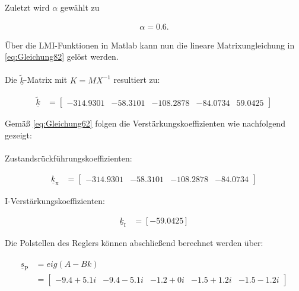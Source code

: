 Zuletzt wird $\alpha$ gewählt zu

\begin{align*}
    \alpha = 0.6.
\end{align*}

Über die LMI-Funktionen in Matlab kann nun die lineare Matrixungleichung in \autoref{eq:Gleichung82} gelöst werden.\\\\
Die $\underline{\tilde{k}}$-Matrix mit $K = MX^{-1}$ resultiert zu:

\begin{align}
    \underline{\tilde{k}} &= 
    \begin{bmatrix}
        -314.9301 & -58.3101 & -108.2878 & -84.0734 & 59.0425
    \end{bmatrix}
\end{align}

Gemäß \autoref{eq:Gleichung62} folgen die Verstärkungskoeffizienten wie nachfolgend gezeigt:\\\\
Zustandsrückführungskoeffizienten:

\begin{align}
    \underline{k}_{\mathrm{x}} &= 
    \begin{bmatrix}
        -314.9301 & -58.3101 & -108.2878 & -84.0734
    \end{bmatrix}
\end{align}

I-Verstärkungskoeffizienten:

\begin{align}
    \underline{k}_{\mathrm{I}} &= [-59.0425]
\end{align}

Die Polstellen des Reglers können abschließend berechnet werden über:

\begin{align}
    \begin{split}
        \underline{s}_{\mathrm{P}} &= eig(A - Bk) \\&=
        \begin{bmatrix}
            -9.4 + 5.1i & -9.4 - 5.1i & -1.2 + 0i & -1.5 + 1.2i & -1.5 - 1.2i
        \end{bmatrix}
    \end{split}
\end{align}

